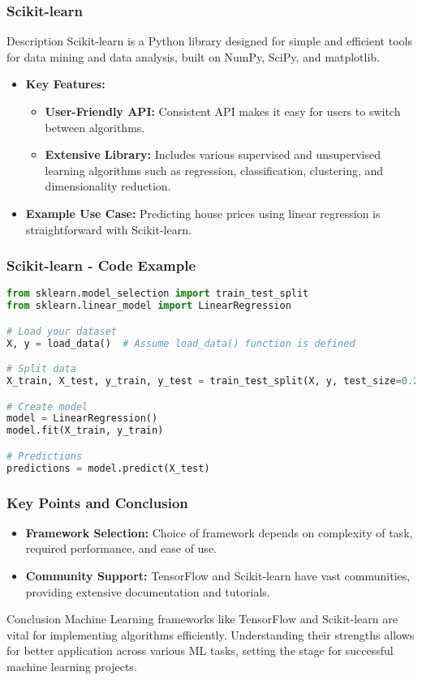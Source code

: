 \documentclass[aspectratio=169]{beamer}
\begin{document}
\begin{frame}[fragile]
    \frametitle{Scikit-learn}
    \begin{block}{Description}
        Scikit-learn is a Python library designed for simple and efficient tools for data mining and data analysis, built on NumPy, SciPy, and matplotlib.
    \end{block}

    \begin{itemize}
        \item \textbf{Key Features:}
        \begin{itemize}
            \item \textbf{User-Friendly API:} Consistent API makes it easy for users to switch between algorithms.
            \item \textbf{Extensive Library:} Includes various supervised and unsupervised learning algorithms such as regression, classification, clustering, and dimensionality reduction.
        \end{itemize}
        \item \textbf{Example Use Case:} 
        Predicting house prices using linear regression is straightforward with Scikit-learn.
    \end{itemize}
\end{frame}

\begin{frame}[fragile]
    \frametitle{Scikit-learn - Code Example}
    \begin{lstlisting}[language=Python]
from sklearn.model_selection import train_test_split
from sklearn.linear_model import LinearRegression

# Load your dataset
X, y = load_data()  # Assume load_data() function is defined

# Split data
X_train, X_test, y_train, y_test = train_test_split(X, y, test_size=0.2)

# Create model
model = LinearRegression()
model.fit(X_train, y_train)

# Predictions
predictions = model.predict(X_test)
    \end{lstlisting}
\end{frame}

\begin{frame}[fragile]
    \frametitle{Key Points and Conclusion}
    \begin{itemize}
        \item \textbf{Framework Selection:} Choice of framework depends on complexity of task, required performance, and ease of use.
        \item \textbf{Community Support:} TensorFlow and Scikit-learn have vast communities, providing extensive documentation and tutorials.
    \end{itemize}

    \begin{block}{Conclusion}
        Machine Learning frameworks like TensorFlow and Scikit-learn are vital for implementing algorithms efficiently. Understanding their strengths allows for better application across various ML tasks, setting the stage for successful machine learning projects.
    \end{block}
\end{frame}
\end{document}

